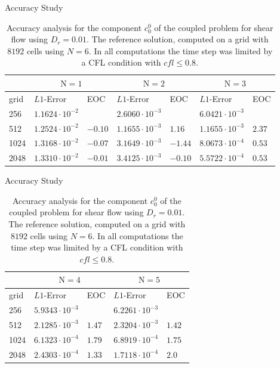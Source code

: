\begin{frame}{Accuracy Study}
	\scriptsize
	\begin{table}[H]
		\centering
		\begin{tabular}{|l|l|l|l|l|l|l|}
			\hline 
			& \multicolumn{2}{|c|}{$\mathrm{N}=1$} & \multicolumn{2}{|c|}{$\mathrm{N}=2$} & \multicolumn{2}{|c|}{$\mathrm{N}=3$}  \\
			\hline 
			grid & $L1$-Error & EOC  & $L1$-Error & EOC  & $L1$-Error & EOC\\
			\hline
			256  & $ 1.1624 \cdot 10^{-2}$ & & $ 2.6060\cdot 10^{-3}$&&$ 6.0421 \cdot 10^{-3}$& \\
			\hline
			512 & $ 1.2524 \cdot 10^{-2}$ & $-0.10$& $1.1655  \cdot 10^{-3}$&$1.16$& $ 1.1655 \cdot 10^{-3}$& $2.37$ \\
			\hline 
			1024  &$ 1.3168 \cdot 10^{-2}$&$-0.07$& $3.1649 \cdot 10^{-3}$& $-1.44$ & $8.0673\cdot 10^{-4}$&$0.53$\\
			\hline
			2048 & $ 1.3310 \cdot 10^{-2}$ &$-0.01$& $  3.4125 \cdot 10^{-3}$&$-0.10$& $ 5.5722 \cdot 10^{-4}$&$0.53$\\
			\hline
		\end{tabular}
		\caption{Accuracy analysis for the component $c^0_0$ of the coupled problem for shear flow using $D_r=0.01$. The reference solution, computed on a grid with $8192$ cells using $N=6$. In all computations the time step was limited by a CFL condition with $cfl \leq 0.8$.}
		\label{tab:Dr=0.01_error_N=1,2,3vsN=6}
	\end{table}
\end{frame}


\begin{frame}{Accuracy Study}
	\scriptsize
	\begin{table}[H]
		\centering
		\begin{tabular}{|l|l|l|l|l|}
			\hline 
			& \multicolumn{2}{|c|}{$\mathrm{N}=4$} & \multicolumn{2}{|c|}{$\mathrm{N}=5$}   \\
			\hline 
			grid & $L1$-Error & EOC  & $L1$-Error & EOC  \\
			\hline
			256  & $5.9343\cdot 10^{-3}$ & & $ 6.2261\cdot 10^{-3}$& \\
			\hline
			512 & $ 2.1285 \cdot 10^{-3}$ & $1.47$ & $2.3204  \cdot 10^{-3}$&$1.42$ \\
			\hline 
			1024  &$ 6.1323\cdot 10^{-4}$&$1.79$& $ 6.8919 \cdot 10^{-4}$& $1.75$ \\
			\hline
			2048 & $ 2.4303 \cdot 10^{-4}$ &$1.33$& $ 1.7118 \cdot 10^{-4}$&$2.0$\\
			\hline
		\end{tabular}
		\caption{Accuracy analysis for the component $c^0_0$ of the coupled problem for shear flow using $D_r=0.01$. The reference solution, computed on a grid with $8192$ cells using $N=6$. In all computations the time step was limited by a CFL condition with $cfl \leq 0.8$.}
		\label{tab:Dr=0.01_error_N=4,5vsN=6}
	\end{table}
\end{frame}


